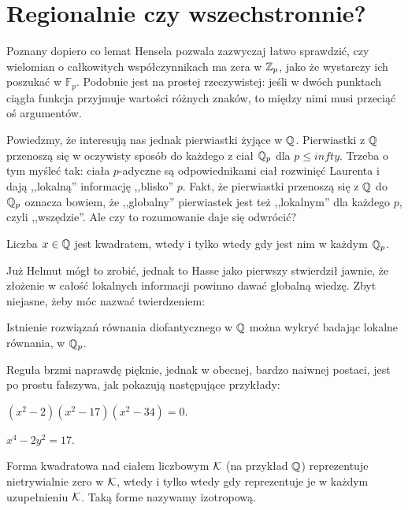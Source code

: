 \section{Regionalnie czy wszechstronnie?}
Poznany dopiero co lemat Hensela pozwala zazwyczaj łatwo sprawdzić, czy wielomian o całkowitych współczynnikach ma zera w $\mathbb Z_p$, jako że wystarczy ich poszukać w $\mathbb F_p$.
Podobnie jest na prostej rzeczywistej: jeśli w dwóch punktach ciągła funkcja przyjmuje wartości różnych znaków, to między nimi musi przeciąć oś argumentów.

Powiedzmy, że interesują nas jednak pierwiastki żyjące w $\mathbb Q$.
Pierwiastki z $\mathbb Q$ przenoszą się w oczywisty sposób do każdego z ciał $\mathbb Q_p$ dla $p \le infty$.
Trzeba o tym myśleć tak: ciała $p$-adyczne są odpowiednikami ciał rozwinięć Laurenta i dają ,,lokalną'' informację ,,blisko'' $p$.
Fakt, że pierwiastki przenoszą się z $\mathbb Q$ do $\mathbb Q_p$ oznacza bowiem, że ,,globalny'' pierwiastek jest też ,,lokalnym'' dla każdego $p$, czyli ,,wszędzie''.
Ale czy to rozumowanie daje się odwrócić?

\begin{fakt}
	Liczba $x \in \mathbb Q$ jest kwadratem, wtedy i tylko wtedy gdy jest nim w każdym $\mathbb Q_p$.
\end{fakt}

Już Helmut mógł to zrobić, jednak to Hasse jako pierwszy stwierdził jawnie, że złożenie w całość lokalnych informacji powinno dawać globalną wiedzę.
Zbyt niejasne, żeby móc nazwać twierdzeniem:

\begin{fakt}
	Istnienie rozwiązań równania diofantycznego w $\mathbb Q$ można wykryć badając lokalne równania, w $\mathbb Q_p$.
\end{fakt}

Reguła brzmi naprawdę pięknie, jednak w obecnej, bardzo naiwnej postaci, jest po prostu fałszywa, jak pokazują następujące przykłady:

\begin{przyklad}
	$(x^2 -2)(x^2-17)(x^2-34) = 0$.
\end{przyklad}

\begin{przyklad}
	$x^4 - 2 y^2 = 17$.
\end{przyklad}

\begin{twierdzenie}
	Forma kwadratowa nad ciałem liczbowym $\mathcal K$ (na przykład $\mathbb Q$) reprezentuje nietrywialnie zero w $\mathcal K$, wtedy i tylko wtedy gdy reprezentuje je w każdym uzupełnieniu $\mathcal K$.
	Taką forme nazywamy izotropową.
\end{twierdzenie}

